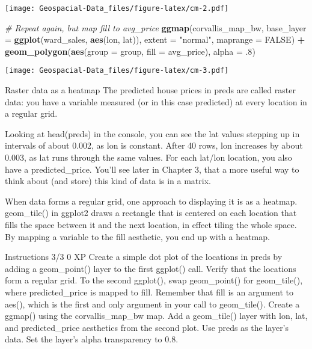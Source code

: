 \documentclass[]{article}
\newenvironment{Shaded}{\begin{snugshade}}{\end{snugshade}}
\newcommand{\CommentTok}[1]{\textcolor[rgb]{0.56,0.35,0.01}{\textit{#1}}}
\newcommand{\DataTypeTok}[1]{\textcolor[rgb]{0.13,0.29,0.53}{#1}}
\newcommand{\FloatTok}[1]{\textcolor[rgb]{0.00,0.00,0.81}{#1}}
\newcommand{\KeywordTok}[1]{\textcolor[rgb]{0.13,0.29,0.53}{\textbf{#1}}}
\newcommand{\NormalTok}[1]{#1}
\newcommand{\OperatorTok}[1]{\textcolor[rgb]{0.81,0.36,0.00}{\textbf{#1}}}
\newcommand{\OtherTok}[1]{\textcolor[rgb]{0.56,0.35,0.01}{#1}}
\newcommand{\StringTok}[1]{\textcolor[rgb]{0.31,0.60,0.02}{#1}}
\begin{document}
\texttt{[image: Geospacial-Data\_files/figure-latex/cm-2.pdf]}

\begin{Shaded}
\begin{Highlighting}[]
\CommentTok{# Repeat again, but map fill to avg_price}
\KeywordTok{ggmap}\NormalTok{(corvallis_map_bw, }
      \DataTypeTok{base_layer =} \KeywordTok{ggplot}\NormalTok{(ward_sales, }\KeywordTok{aes}\NormalTok{(lon, lat)),}
      \DataTypeTok{extent =} \StringTok{"normal"}\NormalTok{, }\DataTypeTok{maprange =} \OtherTok{FALSE}\NormalTok{) }\OperatorTok{+}
\StringTok{  }\KeywordTok{geom_polygon}\NormalTok{(}\KeywordTok{aes}\NormalTok{(}\DataTypeTok{group =}\NormalTok{ group, }\DataTypeTok{fill =}\NormalTok{ avg_price), }\DataTypeTok{alpha =} \FloatTok{.8}\NormalTok{)}
\end{Highlighting}
\end{Shaded}

\texttt{[image: Geospacial-Data\_files/figure-latex/cm-3.pdf]}

Raster data as a heatmap The predicted house prices in preds are called
raster data: you have a variable measured (or in this case predicted) at
every location in a regular grid.

Looking at head(preds) in the console, you can see the lat values
stepping up in intervals of about 0.002, as lon is constant. After 40
rows, lon increases by about 0.003, as lat runs through the same values.
For each lat/lon location, you also have a predicted\_price. You'll see
later in Chapter 3, that a more useful way to think about (and store)
this kind of data is in a matrix.

When data forms a regular grid, one approach to displaying it is as a
heatmap. geom\_tile() in ggplot2 draws a rectangle that is centered on
each location that fills the space between it and the next location, in
effect tiling the whole space. By mapping a variable to the fill
aesthetic, you end up with a heatmap.

Instructions 3/3 0 XP Create a simple dot plot of the locations in preds
by adding a geom\_point() layer to the first ggplot() call. Verify that
the locations form a regular grid. To the second ggplot(), swap
geom\_point() for geom\_tile(), where predicted\_price is mapped to
fill. Remember that fill is an argument to aes(), which is the first and
only argument in your call to geom\_tile(). Create a ggmap() using the
corvallis\_map\_bw map. Add a geom\_tile() layer with lon, lat, and
predicted\_price aesthetics from the second plot. Use preds as the
layer's data. Set the layer's alpha transparency to 0.8.
\end{document}

